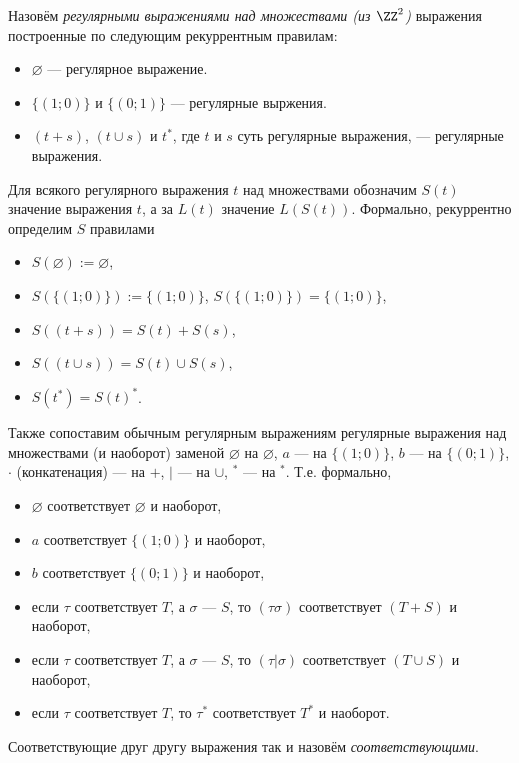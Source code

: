 \documentclass[12pt,a4paper]{article}
\begin{document}
\begin{problem}{8}
\begin{enumerate}
\begin{definition}
                    Назовём \emph{регулярными выражениями над множествами (из $\ZZ^2$)} выражения построенные по следующим рекуррентным правилам:
                    \begin{itemize}
                        \item $\varnothing$ --- регулярное выражение.
                        \item $\{(1; 0)\}$ и $\{(0; 1)\}$ --- регулярные выржения.
                        \item $(t + s)$, $(t \cup s)$ и $t^*$, где $t$ и $s$ суть регулярные выражения, --- регулярные выражения.
                    \end{itemize}
                    Для всякого регулярного выражения $t$ над множествами обозначим $S(t)$ значение выражения $t$, а за $L(t)$ значение $L(S(t))$. Формально, рекуррентно определим $S$ правилами
                    \begin{itemize}
                        \item $S(\varnothing) := \varnothing$,
                        \item $S(\{(1; 0)\}) := \{(1; 0)\}$, $S(\{(1; 0)\}) = \{(1; 0)\}$,
                        \item $S((t + s)) = S(t) + S(s)$,
                        \item $S((t \cup s)) = S(t) \cup S(s)$,
                        \item $S(t^*) = S(t)^*$.
                    \end{itemize}

                    Также сопоставим обычным регулярным выражениям регулярные выражения над множествами (и наоборот) заменой $\varnothing$ на $\varnothing$, $a$ --- на $\{(1; 0)\}$, $b$ --- на $\{(0; 1)\}$, $\cdot$ (конкатенация) --- на $+$, $\mid$ --- на $\cup$, ${}^*$ --- на ${}^*$. Т.е. формально,
                    \begin{itemize}
                        \item $\varnothing$ соответствует $\varnothing$ и наоборот,
                        \item $a$ соответствует $\{(1; 0)\}$ и наоборот,
                        \item $b$ соответствует $\{(0; 1)\}$ и наоборот,
                        \item если $\tau$ соответствует $T$, а $\sigma$ --- $S$, то $(\tau\sigma)$ соответствует $(T + S)$ и наоборот,
                        \item если $\tau$ соответствует $T$, а $\sigma$ --- $S$, то $(\tau|\sigma)$ соответствует $(T \cup S)$ и наоборот,
                        \item если $\tau$ соответствует $T$, то $\tau^*$ соответствует $T^*$ и наоборот. 
                    \end{itemize}
                    Соответствующие друг другу выражения так и назовём \emph{соответствующими}.
                \end{definition}


\end{enumerate}
\end{problem}
\end{document}
